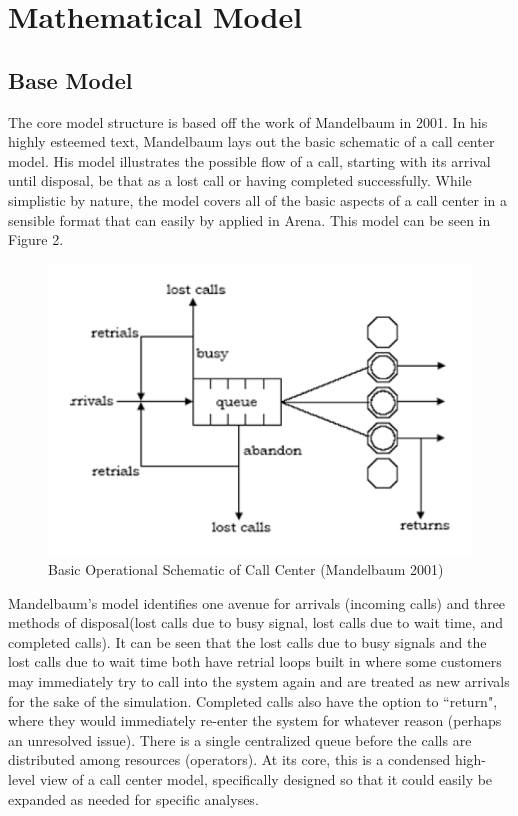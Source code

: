 \documentclass[12pt,twocolumn]{article}
\begin{document}
\section{Mathematical Model}

	\subsection{Base Model}
The core model structure is based off the work of Mandelbaum in 2001\cite{mandelbaum}.  In his highly esteemed text, Mandelbaum lays out the basic schematic of a call center model.  His model illustrates the possible flow of a call, starting with its arrival until disposal, be that as a lost call or having completed successfully.  While simplistic by nature, the model covers all of the basic aspects of a call center in a sensible format that can easily by applied in Arena.  This model can be seen in Figure 2.  

	\begin{figure}[h]
	\includegraphics[scale=.45]{call_center_layout.png}
	\caption{Basic Operational Schematic of Call Center (Mandelbaum 2001)}
	\end{figure}

Mandelbaum's model identifies one avenue for arrivals (incoming calls) and three methods of disposal(lost calls due to busy signal, lost calls due to wait time, and completed calls).  It can be seen that the lost calls due to busy signals and the lost calls due to wait time both have retrial loops built in where some customers may immediately try to call into the system again and are treated as new arrivals for the sake of the simulation.  Completed calls also have the option to ``return", where they would immediately re-enter the system for whatever reason (perhaps an unresolved issue).  There is a single centralized queue before the calls are distributed among resources (operators).  At its core, this is a condensed high-level view of a call center model, specifically designed so that it could easily be expanded as needed for specific analyses.
\end{document}
